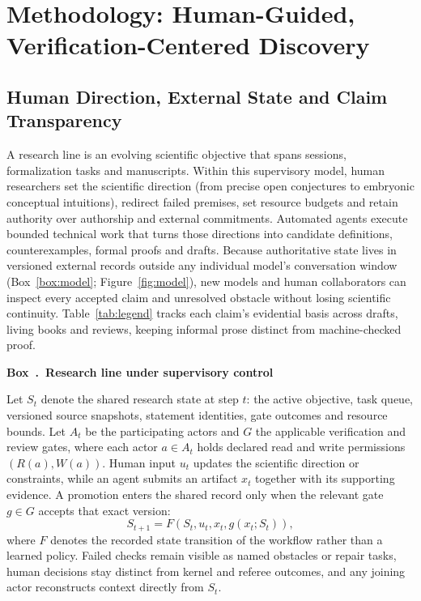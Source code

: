 \documentclass[11pt,a4paper]{article}
\newcounter{protocolbox}
\newenvironment{protocol}[1]{\refstepcounter{protocolbox}\begin{framed}\noindent\textbf{Box~\theprotocolbox.\ #1}\par\small}{\end{framed}}
\begin{document}
\section{Methodology: Human-Guided, Verification-Centered Discovery}
\label{sec:methods}
\subsection{Human Direction, External State and Claim Transparency}
\label{sec:control}
A research line is an evolving scientific objective that spans sessions,
formalization tasks and manuscripts. Within this supervisory model, human
researchers set the scientific direction (from precise open conjectures to
embryonic conceptual intuitions), redirect failed premises, set resource
budgets and retain authority over authorship and external commitments.
Automated agents execute bounded technical work that turns those directions
into candidate definitions, counterexamples, formal proofs and drafts. Because
authoritative state lives in versioned external records outside any individual
model's conversation window (Box~\ref{box:model}; Figure~\ref{fig:model}), new
models and human collaborators can inspect every accepted claim and unresolved
obstacle without losing scientific continuity. Table~\ref{tab:legend} tracks
each claim's evidential basis across drafts, living books and reviews, keeping
informal prose distinct from machine-checked proof.

\noindent\begin{minipage}{\linewidth}
\begin{protocol}{Research line under supervisory control}
\label{box:model}
Let $S_t$ denote the shared research state at step $t$: the active objective,
task queue, versioned source snapshots, statement identities, gate outcomes and
resource bounds. Let $A_t$ be the participating actors and $G$ the applicable
verification and review gates, where each actor $a\in A_t$ holds declared read
and write permissions $(R(a),W(a))$. Human input $u_t$ updates the scientific
direction or constraints, while an agent submits an artifact $x_t$ together
with its supporting evidence. A promotion enters the shared record only when
the relevant gate $g\in G$ accepts that exact version:
\[
 S_{t+1}=F(S_t,u_t,x_t,g(x_t;S_t)),
\]
where $F$ denotes the recorded state transition of the workflow rather than a
learned policy. Failed checks remain visible as named obstacles or repair
tasks, human decisions stay distinct from kernel and referee outcomes, and any
joining actor reconstructs context directly from $S_t$.
\end{protocol}
\end{minipage}
\end{document}
